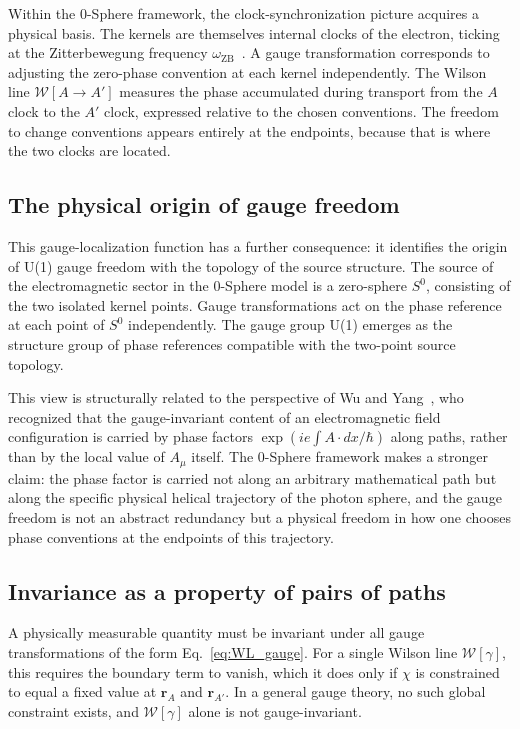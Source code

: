 \documentclass[%
 reprint, amsmath,amssymb, aps, prb, ]{revtex4-2}
\numberwithin{equation}{section}
\newcommand{\omZB}{\omega_{\text{ZB}}}
\newcommand{\WL}{\mathcal{W}}
\begin{document}
Within the 0-Sphere framework, the clock-synchronization picture acquires a physical basis. The kernels are themselves internal clocks of the electron, ticking at the Zitterbewegung frequency $\omZB$~\cite{hanamura22, hanamura33}. A gauge transformation corresponds to adjusting the zero-phase convention at each kernel independently. The Wilson line $\WL[A\to A']$ measures the phase accumulated during transport from the $A$ clock to the $A'$ clock, expressed relative to the chosen conventions. The freedom to change conventions appears entirely at the endpoints, because that is where the two clocks are located.

\subsection{The physical origin of gauge freedom}

This gauge-localization function has a further consequence: it identifies the origin of U(1) gauge freedom with the topology of the source structure. The source of the electromagnetic sector in the 0-Sphere model is a zero-sphere $S^0$, consisting of the two isolated kernel points. Gauge transformations act on the phase reference at each point of $S^0$ independently. The gauge group U(1) emerges as the structure group of phase references compatible with the two-point source topology.

This view is structurally related to the perspective of Wu and Yang~\cite{WuYang1975}, who recognized that the gauge-invariant content of an electromagnetic field configuration is carried by phase factors $\exp(ie\int A\cdot dx/\hbar)$ along paths, rather than by the local value of $A_\mu$ itself. The 0-Sphere framework makes a stronger claim: the phase factor is carried not along an arbitrary mathematical path but along the specific physical helical trajectory of the photon sphere, and the gauge freedom is not an abstract redundancy but a physical freedom in how one chooses phase conventions at the endpoints of this trajectory.

\subsection{Invariance as a property of pairs of paths}

A physically measurable quantity must be invariant under all gauge transformations of the form Eq.~\eqref{eq:WL_gauge}. For a single Wilson line $\WL[\gamma]$, this requires the boundary term to vanish, which it does only if $\chi$ is constrained to equal a fixed value at $\mathbf{r}_A$ and $\mathbf{r}_{A'}$. In a general gauge theory, no such global constraint exists, and $\WL[\gamma]$ alone is not gauge-invariant.
\end{document}

